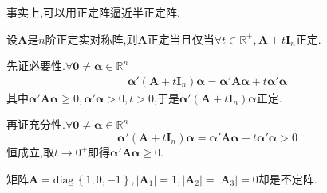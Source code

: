 \begin{red}
    \begin{remark}
        事实上,可以用正定阵逼近半正定阵.
    \end{remark}
\end{red}
\begin{green}
    \begin{lemma}[正定与半正定]\label{lem:正定与半正定}
        设$\bm{A}$是$n$阶正定实对称阵,则$\bm{A}$正定当且仅当$\forall t\in\mathbb{R}^+,\bm{A}+t\bm{I}_n$正定.
    \end{lemma}
    \begin{Proof}
        先证必要性.$\forall \bm{0}\neq\bm{\alpha}\in\mathbb{R}^n$\begin{align*}
        \bm{\alpha}'\left(
            \bm{A}+t\bm{I}_n
            \right)\bm{\alpha}=\bm{\alpha}'\bm{A\alpha}+t\bm{\alpha}'\bm{\alpha}
        \end{align*}其中$\bm{\alpha}'\bm{A\alpha}\geqslant 0,\bm{\alpha}'\bm{\alpha}>0,t>0$,于是$\bm{\alpha}'\left(\bm{A}+t\bm{I}_n\right)\bm{\alpha}$正定.

        再证充分性.$\forall\bm{0}\neq\bm{\alpha}\in\mathbb{R}^n$\[
        \bm{\alpha}'\left(
            \bm{A}+t\bm{I}_n
        \right)\bm{\alpha}=\bm{\alpha}'\bm{A\alpha}+t\bm{\alpha}'\bm{\alpha}>0
        \]恒成立,取$t\to0^+$即得$\bm{\alpha}'\bm{A\alpha}\geqslant 0.$
    \end{Proof}
\end{green}
\begin{brown}
    \begin{example}
        矩阵$\bm{A}=\mathrm{diag}\,\left\{
            1,0,-1
        \right\},\left|\bm{A}_1\right|=1,\left|\bm{A}_2\right|=\left|\bm{A}_3\right|=0$却是不定阵.
    \end{example}
\end{brown}
